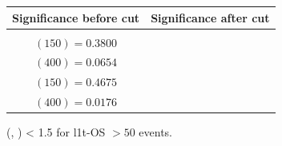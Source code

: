 \documentclass[letterpaper,12pt]{article}
\begin{document}
\begin{figure}[h!]
  \vspace{0.6cm}
  \tiny
  \setlength{\tabcolsep}{20pt}
  \renewcommand{\arraystretch}{1.6}
  \begin{tabular}{|c|c|}
    \hline
    Significance before cut & Significance after cut\\
    \hline
    \Gape[0.2cm]{\makecell{
        \sig{} $(100) = 0.2990$\\
        \sig{} $(150) = 0.3800$\\
        \sig{} $(400) = 0.0654$ }} & 
    \makecell{
      \sig{} $(100) = 0.4811$\\
      \sig{} $(150) = 0.4675$\\
      \sig{} $(400) = 0.0176$}\\
    \hline
  \end{tabular}
  \caption[\2l1t-OS Cut-1: \DeltaR{} (\ll, \ls) < 1.5]{\DeltaR{} (\ll, \ls) < 1.5 for \2l1t-OS \metpt $>50$ events.}
  \label{fig:2l1tc1}
  \vspace{1cm}
\end{figure}
\end{document}
